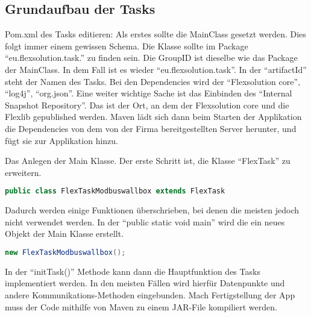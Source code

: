\subsection{Grundaufbau der Tasks}

\begin{compactenum}
    
    \item Pom.xml des Tasks editieren: Als erstes sollte die MainClass gesetzt werden. Dies folgt immer einem gewissen Schema. Die Klasse sollte im Package “eu.flexsolution.task.” zu finden sein. Die GroupID ist dieselbe wie das Package der MainClass. In dem Fall ist es wieder “eu.flexsolution.task”.  In der “artifactId” steht der Namen des Tasks. Bei den Dependencies wird der “Flexsolution core”, “log4j”, “org.json”. Eine weiter wichtige Sache ist das Einbinden des “Internal Snapshot Repository”. Das ist der Ort, an dem der Flexsolution core und die Flexlib gepublished werden. Maven lädt sich dann beim Starten der Applikation die Dependencies von dem von der Firma bereitgestellten Server herunter, und fügt sie zur Applikation hinzu.  
    \item Das Anlegen der Main Klasse. Der erste Schritt ist, die Klasse “FlexTask” zu erweitern. 
    \begin{lstlisting}[language=java,caption=Example Element,label=lst:impl:foo]
        public class FlexTaskModbuswallbox extends FlexTask 
    \end{lstlisting}
    Dadurch werden einige Funktionen überschrieben, bei denen die meisten jedoch nicht verwendet werden. In der “public static void main” wird die ein neues Objekt der Main Klasse erstellt.
    \begin{lstlisting}[language=java,caption=Example Element,label=lst:impl:foo]
        new FlexTaskModbuswallbox();  
    \end{lstlisting}
    In der “initTask(){}” Methode kann dann die Hauptfunktion des Tasks implementiert werden. In den meisten Fällen wird hierfür Datenpunkte und andere Kommunikations-Methoden eingebunden. Mach Fertigstellung der App muss der Code mithilfe von Maven zu einem JAR-File kompiliert werden.  
    

\end{compactenum}
